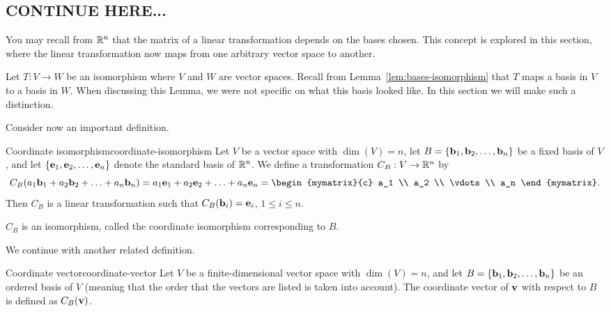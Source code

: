 \subsection{CONTINUE HERE...}

You may recall from $\mathbb{R}^n$ that the matrix of a linear transformation
depends on the bases chosen. This concept is explored in this section,
where the linear transformation now maps from one arbitrary vector
space to another.

Let $T: V \to W$ be an isomorphism where $V$ and $W$ are vector
spaces. Recall from Lemma~\ref{lem:bases-isomorphism} that $T$ maps a
basis in $V$ to a basis in $W$. When discussing this Lemma, we were
not specific on what this basis looked like. In this section we will
make such a distinction.

Consider now an important definition.

\begin{definition}{Coordinate isomorphism}{coordinate-isomorphism}
  Let $V$ be a vector space with $\dim(V)=n$, let
  $B=\left\{\mbox{\bf b}_1, \mbox{\bf b}_2, \ldots, \mbox{\bf b}_n\right\}$ be a fixed
  basis of $V$, and let
  $\left\{\mbox{\bf e}_1, \mbox{\bf e}_2, \ldots, \mbox{\bf e}_n\right\}$ denote the
  standard basis of $\mathbb{R}^n$.  We define a transformation $C_B:V\to\mathbb{R}^n$
  by
  \begin{equation*}
    C_B(a_1\vect{b}_1 + a_2\vect{b}_2 + \ldots + a_n\vect{b}_n)
    =
    a_1\vect{e}_1 + a_2\vect{e}_2 + \ldots + a_n\vect{e}_n
    =
    \begin{mymatrix}{c} a_1 \\ a_2 \\ \vdots \\ a_n
    \end{mymatrix}.
  \end{equation*}
  Then $C_B$ is a linear transformation
  such that
  $C_B(\mbox{\bf b}_i)=\mbox{\bf e}_i$, $1\leq i\leq n$.

  $C_B$ is an isomorphism, called
  the coordinate isomorphism corresponding to $B$.
\end{definition}

We continue with another related definition.

\begin{definition}{Coordinate vector}{coordinate-vector}
  Let $V$ be a finite-dimensional vector space with $\dim(V)=n$, and
  let $B=\left\{\mbox{\bf b}_1, \mbox{\bf b}_2, \ldots, \mbox{\bf b}_n\right\}$ be an
  ordered basis of $V$ (meaning that the order that the vectors are
  listed is taken into account).  The coordinate vector of $\mbox{\bf v}$
  with respect to $B$ is defined as $C_B(\mbox{\bf v})$.
\end{definition}

